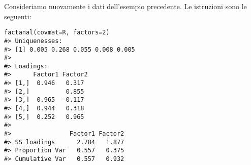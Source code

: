 Consideriamo nuovamente i dati dell'esempio precedente.
  Le istruzioni \R sono le seguenti:
\begin{lstlisting}
factanal(covmat=R, factors=2)
#> Uniquenesses:
#> [1] 0.005 0.268 0.055 0.008 0.005
#> 
#> Loadings:
#>      Factor1 Factor2
#> [1,]  0.946   0.317 
#> [2,]          0.855 
#> [3,]  0.965  -0.117 
#> [4,]  0.944   0.318 
#> [5,]  0.252   0.965 
#> 
#>                Factor1 Factor2
#> SS loadings      2.784   1.877
#> Proportion Var   0.557   0.375
#> Cumulative Var   0.557   0.932
\end{lstlisting}


